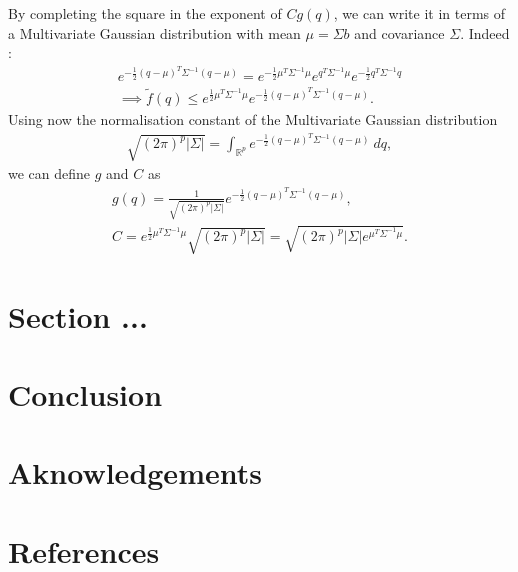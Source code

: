 \documentclass[a4paper, 12pt,oneside]{article}
\begin{document}
	By completing the square in the exponent of $Cg(q)$, we can write it in terms of a Multivariate Gaussian distribution with mean $\mu=\Sigma b$ and covariance $\Sigma$. Indeed : 
	\begin{gather}
		e^{-\frac{1}{2}(q-\mu)^T\Sigma^{-1} (q-\mu)} =
		e^{-\frac{1}{2}\mu^T\Sigma^{-1}\mu}
		e^{q^T\Sigma^{-1}\mu}
		e^{-\frac{1}{2}q^T\Sigma^{-1} q} \\
		\implies \tilde{f}(q) \le e^{\frac{1}{2}\mu^T\Sigma^{-1} \mu}e^{-\frac{1}{2}(q-\mu)^T\Sigma^{-1}(q-\mu)}.
	\end{gather}
	Using now the normalisation constant of the Multivariate Gaussian distribution 
	\begin{gather}
		\sqrt{(2\pi)^p|\Sigma|}=\int_{\mathbb{R}^p}e^{-\frac{1}{2}(q-\mu)^T\Sigma^{-1}(q-\mu)}\ dq,
	\end{gather} 
	we can define $g$ and $C$ as 
	\begin{gather}
		g(q)=\frac{1}{\sqrt{(2\pi)^p|\Sigma|}}e^{-\frac{1}{2}(q-\mu)^T\Sigma^{-1}(q-\mu)}, \\
		C = e^{\frac{1}{2}\mu^T\Sigma^{-1} \mu}{\sqrt{(2\pi)^p|\Sigma|}} = \sqrt{(2\pi)^p|\Sigma|e^{\mu^T\Sigma^{-1} \mu}}.
	\end{gather} 
	\section{Section ...}
	\section{Conclusion}
	\section*{Aknowledgements}
	\section*{References}
\end{document}

